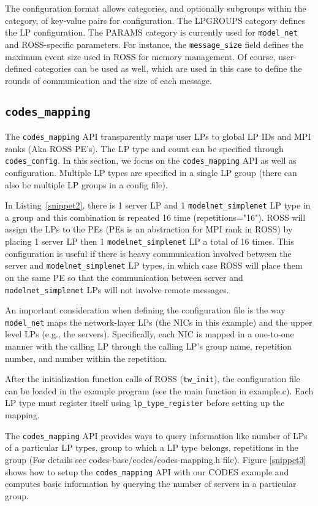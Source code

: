 \documentclass[conference,10pt,compsocconf,onecolumn]{IEEEtran}
\newcommand{\codesmapping}[1]{\texttt{codes\_mapping}}
\newcommand{\codesconfig}[1]{\texttt{codes\_config}}
\newcommand{\codesmodelnet}[1]{\texttt{model\_net}}
\begin{document}
The configuration format allows categories, and optionally subgroups within the
category, of key-value pairs for configuration. The LPGROUPS category defines
the LP configuration. The PARAMS category is currently used for
\codesmodelnet{} and ROSS-specific parameters. For instance, the
\texttt{message\_size} field defines the maximum event size used in ROSS for
memory management. Of course, user-defined categories can be used as well,
which are used in this case to define the rounds of communication and the size
of each message.

\subsection{\codesmapping{}}
\label{subsec:codes_mapping}

The \codesmapping{} API transparently maps user LPs to global LP IDs and MPI
ranks (Aka ROSS PE's). The LP type and count can be specified through
\codesconfig{}. In this section, we focus on the \codesmapping{} API as well as
configuration. Multiple LP types are specified in a single LP group (there can
also be multiple LP groups in a config file).

In Listing~\ref{snippet2}, there is 1 server LP and 1
\texttt{modelnet\_simplenet} LP type in a group and this combination is repeated
16 time (repetitions="16").  ROSS will assign the LPs to the PEs (PEs is an
abstraction for MPI rank in ROSS) by placing 1 server LP then 1
\texttt{modelnet\_simplenet} LP a total of 16 times. This configuration is
useful if there is heavy communication involved between the server and
\texttt{modelnet\_simplenet} LP types, in which case ROSS will place them on the
same PE so that the communication between server and
\texttt{modelnet\_simplenet} LPs will not involve remote messages. 

An important consideration when defining the configuration file is the way
\codesmodelnet{} maps the network-layer LPs (the NICs in this example) and the upper
level LPs (e.g., the servers). Specifically, each NIC is mapped in a one-to-one
manner with the calling LP through the calling LP's group name, repetition
number, and number within the repetition.

After the initialization function calls of ROSS (\texttt{tw\_init}), the
configuration file can be loaded in the example program (see the main function
in example.c). Each LP type must register itself using
\texttt{lp\_type\_register} before setting up the mapping.

The \codesmapping{} API provides ways to query information like number of LPs of
a particular LP types, group to which a LP type belongs, repetitions in the
group (For details see codes-base/codes/codes-mapping.h file).  Figure
\ref{snippet3} shows how to setup the \codesmapping{} API with our CODES example
and computes basic information by querying the number of servers in a particular
group. 
\end{document}
